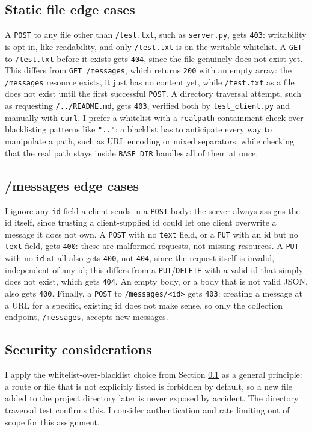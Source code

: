 \documentclass[conference]{IEEEtran}
\begin{document}
\subsection{Static file edge cases}\label{Subsection:disc_static}
A \texttt{POST} to any file other than \texttt{/test.txt}, such as
\texttt{server.py}, gets \texttt{403}: writability is opt-in, like
readability, and only \texttt{/test.txt} is on the writable whitelist. A
\texttt{GET} to \texttt{/test.txt} before it exists gets \texttt{404},
since the file genuinely does not exist yet. This differs from
\texttt{GET /messages}, which returns \texttt{200} with an empty array:
the \texttt{/messages} resource exists, it just has no content yet, while
\texttt{/test.txt} as a file does not exist until the first successful
\texttt{POST}. A directory traversal attempt, such as requesting
\texttt{/../README.md}, gets \texttt{403}, verified both by
\texttt{test\_client.py} and manually with \texttt{curl}. I prefer a
whitelist with a \texttt{realpath} containment check over blacklisting
patterns like \texttt{".."}: a blacklist has to anticipate every way to
manipulate a path, such as URL encoding or mixed separators, while
checking that the real path stays inside \texttt{BASE\_DIR} handles all
of them at once.

\subsection{/messages edge cases}\label{Subsection:disc_messages}
I ignore any \texttt{id} field a client sends in a \texttt{POST} body: the
server always assigns the id itself, since trusting a client-supplied id
could let one client overwrite a message it does not own. A \texttt{POST}
with no \texttt{text} field, or a \texttt{PUT} with an id but no
\texttt{text} field, gets \texttt{400}: these are malformed requests, not
missing resources. A \texttt{PUT} with no \texttt{id} at all also gets
\texttt{400}, not \texttt{404}, since the request itself is invalid,
independent of any id; this differs from a \texttt{PUT}/\texttt{DELETE}
with a valid id that simply does not exist, which gets \texttt{404}. An
empty body, or a body that is not valid JSON, also gets \texttt{400}.
Finally, a \texttt{POST} to \texttt{/messages/<id>} gets \texttt{403}:
creating a message at a URL for a specific, existing id does not make
sense, so only the collection endpoint, \texttt{/messages}, accepts new
messages.

\subsection{Security considerations}\label{Subsection:disc_security}
I apply the whitelist-over-blacklist choice from Section
\ref{Subsection:disc_static} as a general principle: a route or file that
is not explicitly listed is forbidden by default, so a new file added to
the project directory later is never exposed by accident. The directory
traversal test confirms this. I consider authentication and rate limiting
out of scope for this assignment.
\end{document}
